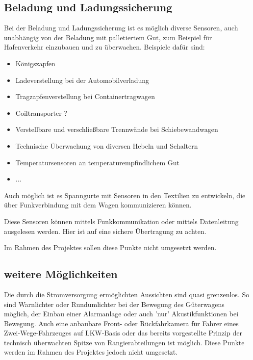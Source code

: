 \subsection{Beladung und Ladungssicherung}
Bei der Beladung und Ladungssicherung ist es möglich diverse Sensoren, auch unabhängig von der Beladung mit palletiertem Gut, zum Beispiel für Hafenverkehr einzubauen und zu überwachen. Beispiele dafür sind:
\begin{itemize}
    \item Königszapfen
    \item Ladeverstellung bei der Automobilverladung
    \item Tragzapfenverstellung bei Containertragwagen
    \item Coiltransporter ?
    \item Verstellbare und verschließbare Trennwände bei Schiebewandwagen
    \item Technische Überwachung von diversen Hebeln und Schaltern
    \item Temperatursensoren an temperaturempfindlichem Gut
    \item ...
\end{itemize}
Auch möglich ist es Spanngurte mit Sensoren in den Textilien zu entwickeln, die über Funkverbindung mit dem Wagen kommunizieren können.\par
Diese Sensoren können mittels Funkkommunikation oder mittels Datenleitung ausgelesen werden. Hier ist auf eine sichere Übertragung zu achten.\par
Im Rahmen des Projektes sollen diese Punkte nicht umgesetzt werden.

\subsection{weitere Möglichkeiten}
Die durch die Stromversorgung ermöglichten Aussichten sind quasi grenzenlos. So sind Warnlichter oder Rundumlichter bei der Bewegung des Güterwagens möglich, der Einbau einer Alarmanlage oder auch 'nur' Akustikfunktionen bei Bewegung. Auch eine anbaubare Front- oder Rückfahrkamera für Fahrer eines Zwei-Wege-Fahrzeuges auf LKW-Basis oder das bereits vorgestellte Prinzip der technisch überwachten Spitze von Rangierabteilungen\cite{RTUS} ist möglich. Diese Punkte werden im Rahmen des Projektes jedoch nicht umgesetzt.

